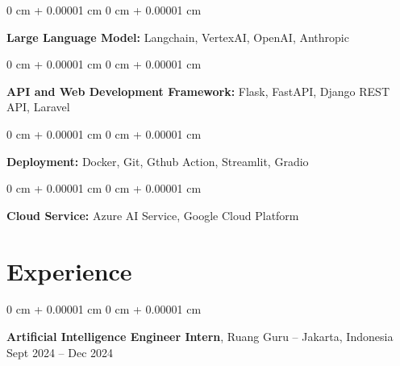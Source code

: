 \documentclass[10pt, a4paper]{article}
\newenvironment{onecolentry}{
    \begin{adjustwidth}{
        0 cm + 0.00001 cm
    }{
        0 cm + 0.00001 cm
    }
}{
    \end{adjustwidth}
} %
\newenvironment{twocolentry}[2][]{
    \onecolentry
    \def\secondColumn{#2}
    \setcolumnwidth{\fill, 4.5 cm}
    \begin{paracol}{2}
}{
    \switchcolumn \raggedleft \secondColumn
    \end{paracol}
    \endonecolentry
} %
\begin{document}
        \vspace{0.2 cm}

        \begin{onecolentry}
            \textbf{Large Language Model:} Langchain, VertexAI, OpenAI, Anthropic
        \end{onecolentry}

        \vspace{0.2 cm}

        \begin{onecolentry}
            \textbf{API and Web Development Framework:} Flask, FastAPI, Django REST API, Laravel
        \end{onecolentry}

        \vspace{0.2 cm}

        \begin{onecolentry}
            \textbf{Deployment:} Docker, Git, Gthub Action, Streamlit, Gradio
        \end{onecolentry}

        \vspace{0.2 cm}

        \begin{onecolentry}
            \textbf{Cloud Service:} Azure AI Service, Google Cloud Platform
        \end{onecolentry}


    
    \section{Experience}



        
        \begin{twocolentry}{
            Sept 2024 – Dec 2024
        }
            \textbf{Artificial Intelligence Engineer Intern}, Ruang Guru -- Jakarta, Indonesia\end{twocolentry}
\end{document}
